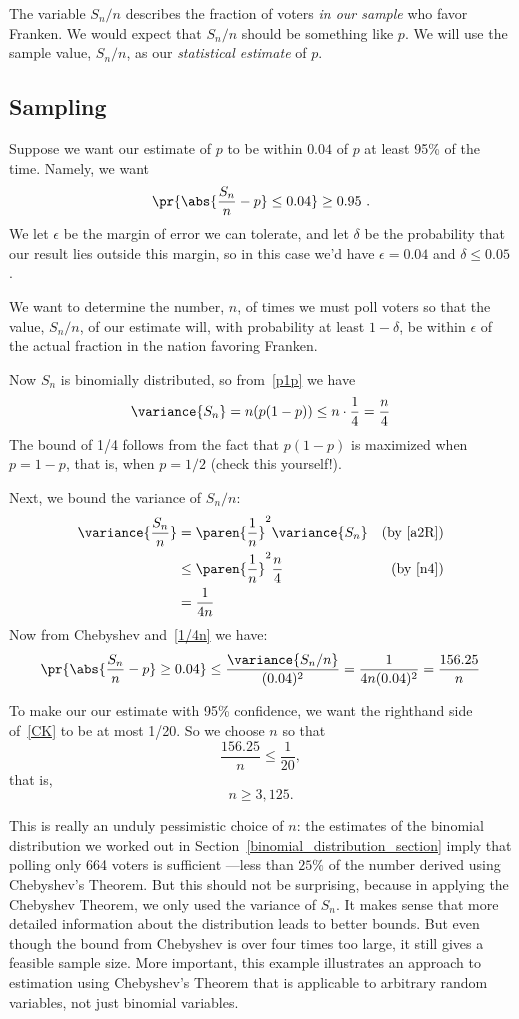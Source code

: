 The variable $S_n/n$ describes the fraction of voters \emph{in our sample}
who favor Franken.  We would expect that $S_n/n$ should
be something like $p$.
We will use the sample value, $S_n/n$, as our \emph{statistical estimate} of
$p$.

\subsection{Sampling}
Suppose we want our estimate of $p$ to be within $0.04$
of $p$ at least 95\% of the time.  Namely, we want
\[
\pr{\abs{\frac{S_n}{n} - p} \leq 0.04} \geq 0.95\ .
\]
We let $\epsilon$ be the margin of error we can tolerate, and let $\delta$
be the probability that our result lies outside this margin, so in this
case we'd have $\epsilon = 0.04$ and $\delta \le 0.05$.

We want to determine the number, $n$, of times we must poll voters so that
the value, $S_n/n$, of our estimate will, with probability at least
$1 -\delta$, be within $\epsilon$ of the actual fraction in the nation
favoring Franken.

Now $S_n$ is binomially distributed, so from~\eqref{p1p} we have
\[
\variance{S_n}  = n(p(1-p)) \leq n \cdot \frac{1}{4} = \frac{n}{4}\label{n4}
\]
The bound of 1/4 follows from the fact that $p(1-p)$ is maximized when $p
= 1-p$, that is, when $p=1/2$ (check this yourself!).

Next, we bound the variance of $S_n/n$:
\begin{align}
\variance{\frac{S_n}{n}}
       & = \paren{\frac{1}{n}}^2 \variance{S_n}
                     & \text{(by~\eqref{a2R})}\notag\\
       & \leq \paren{\frac{1}{n}}^2 \frac{n}{4} & \text{(by~\eqref{n4})}\notag\\
       & = \frac{1}{4n}\label{1/4n}
\end{align}
Now from Chebyshev and~\eqref{1/4n} we have:
\begin{equation}\label{CK}
\pr{\abs{\frac{S_n}{n} - p} \geq 0.04}
    \leq \frac{\variance{S_n/n}}{(0.04)^2}
       = \frac{1}{4n(0.04)^2} = \frac{156.25}{n}
\end{equation}

To make our our estimate with  95\% confidence, we want the righthand
side of~\eqref{CK} to be at most 1/20.  So we choose $n$ so that
\[
\frac{156.25}{n} \leq \frac{1}{20},
\]
that is,
\[
n \geq 3,125.
\]

This is really an unduly pessimistic choice of $n$: the estimates of the
binomial distribution we worked out in
Section~\ref{binomial_distribution_section} imply that polling only 664
voters is sufficient ---less than $25\%$ of the number derived using
Chebyshev's Theorem.  But this should not be surprising, because in
applying the Chebyshev Theorem, we only used the variance of $S_n$.  It
makes sense that more detailed information about the distribution leads to
better bounds.  But even though the bound from Chebyshev is over four
times too large, it still gives a feasible sample size.  More important,
this example illustrates an approach to estimation using Chebyshev's
Theorem that is applicable to arbitrary random variables, not just
binomial variables.

